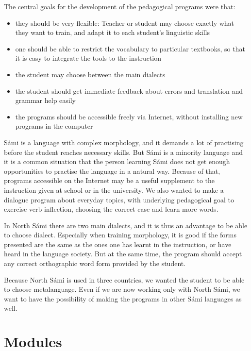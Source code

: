 \documentclass[11pt]{article}
\begin{document}
The central goals for the development of the pedagogical programs were that:

\begin{itemize}
\item they should be very flexible: Teacher or student may choose exactly what they want to train, and adapt it to each student's linguistic skills 
\item one should be able to restrict the vocabulary to particular textbooks, so that it is easy to integrate the tools to the instruction
\item the student may choose between the main dialects 
\item the student should get immediate feedback about errors and translation and grammar help easily
\item the programs should be accessible freely via Internet, without installing new programs in the computer
\end{itemize}

Sámi is a language with complex morphology, and it demands a lot of practising before the student reaches necessary skills. But Sámi is a minority language and it is a common situation that the person learning Sámi does not get enough opportunities to practise the language in a natural way. Because of that, programs accessible on the Internet may be a useful supplement to the instruction given at school or in the university. We also wanted to make a dialogue program about everyday topics, with underlying pedagogical goal to exercise verb inflection, choosing the correct case and learn more words. 

In North Sámi there are two main dialects, and it is thus an advantage to be able to choose dialect. Especially when training morphology, it is good if the forms presented are the same as the ones one has learnt in the instruction, or have heard in the language society. But at the same time, the program should accept any correct orthographic word form provided by the student.

Because North Sámi is used in three countries, we wanted the student to be able to choose metalanguage. Even if we are now working only with North Sámi, we want to have the possibility of making the programs in other Sámi languages as well.



\section{Modules}
\end{document}
